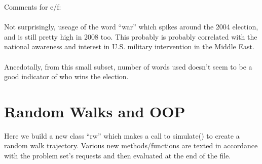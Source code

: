 \documentclass{article}\usepackage[]{graphicx}\usepackage[]{color}
\begin{document}
Comments for e/f:\\\\
Not surprisingly, useage of the word ``war'' which spikes around the 2004 election, and is still pretty high in 2008 too.  This probably is probably correlated with the national awareness and interest in U.S. military intervention in the Middle East.\\\\
Ancedotally, from this small subset, number of words used doesn't seem to be a good indicator of who wins the election.

\section{Random Walks and OOP}

Here we build a new class ``rw'' which makes a call to simulate() to create a random walk trajectory.  Various new methods/functions are texted in accordance with the problem set's requests and then evaluated at the end of the file.
\end{document}
